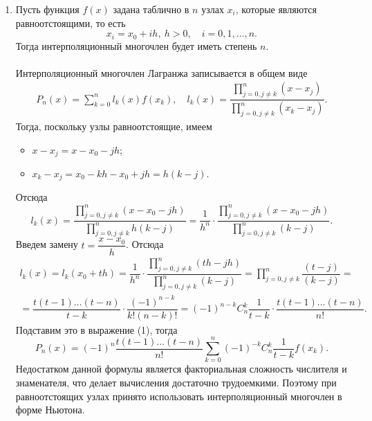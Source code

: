 \documentclass[a4paper, 12pt]{article}
\begin{document}
\begin{enumerate}
	\newpage
	\item 
	\hypertarget{t5}{}
	Пусть функция $f(x)$ задана таблично в $n$ узлах $x_i$, которые являются равноотстоящими, то есть $$x_i = x_0 + ih,\ h>0,\quad i = 0,1,\ldots,n.$$
	Тогда интерполяционный многочлен будет иметь степень $n$.\\\\
	Интерполяционный многочлен Лагранжа записывается в общем виде \begin{eqnarray}
		P_n(x) = \sum_{k=0}^{n}l_k(x) f(x_k),\quad l_k(x) = \dfrac{\prod\limits_{j=0, j\ne k}^n (x-x_j)}{\prod\limits_{j=0, j\ne k}^n (x_k-x_j)}.
	\end{eqnarray}
	Тогда, поскольку узлы равноотстоящие, имеем \begin{itemize}
		\item $x - x_j = x - x_0 - jh$;
		\item $x_k - x_j = x_0 - kh - x_0 + jh = h(k-j)$.
	\end{itemize}
	Отсюда $$l_k(x) = \dfrac{\prod\limits_{j=0, j\ne k}^n (x - x_0 - jh)}{\prod\limits_{j=0, j\ne k}^n h(k-j)} = \dfrac{1}{h^n}\cdot \dfrac{\prod\limits_{j=0, j\ne k}^n (x - x_0 - jh)}{\prod\limits_{j=0, j\ne k}^n (k-j)}.$$
	Введем замену $t = \dfrac{x-x_0}{h}$.
	Отсюда \begin{multline*}
		l_k(x) = l_k(x_0 + th) = \dfrac{1}{h^n}\cdot \dfrac{\prod\limits_{j=0, j\ne k}^n (th - jh)}{\prod\limits_{j=0, j\ne k}^n (k-j)}=\prod\limits_{j=0, j\ne k}^n\dfrac{(t - j)}{(k-j)}=\\=\dfrac{t(t-1)\ldots (t-n)}{t-k}\cdot \dfrac{(-1)^{n-k}}{k!(n-k)!} = (-1)^{n-k} C^k_n\dfrac{1}{t-k}\cdot \dfrac{t(t-1)\ldots (t-n)}{n!}.
	\end{multline*}
	Подставим это в выражение (1), тогда $$P_n(x) = (-1)^n\dfrac{t(t-1)\ldots (t-n)}{n!}\sum_{k=0}^{n}(-1)^{-k}C^k_n\dfrac{1}{t-k}f(x_k).$$
	Недостатком данной формулы является факториальная сложность числителя и знаменателя, что делает вычисления достаточно трудоемкими. Поэтому при равноотстоящих узлах принято использовать интерполяционный многочлен в форме Ньютона.
	

\end{enumerate}
\end{document}
